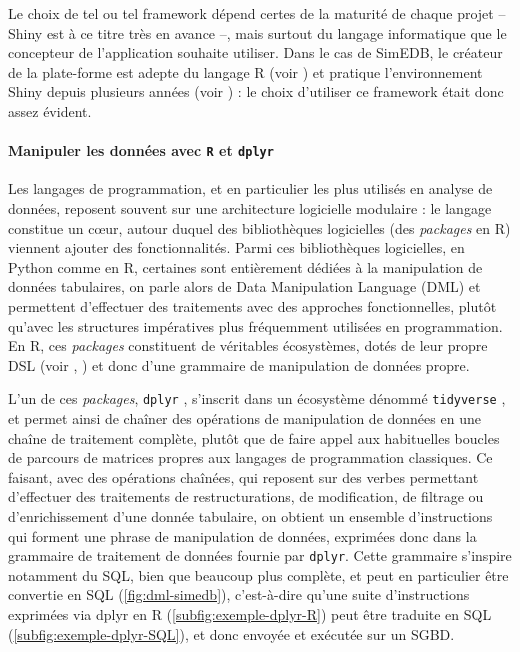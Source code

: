 Le choix de tel ou tel framework dépend certes de la maturité de chaque projet -- Shiny est à ce titre très en avance --, mais surtout du langage informatique que le concepteur de l'application souhaite utiliser.
Dans le cas de SimEDB, le créateur de la plate-forme est adepte du langage R (voir \cite{commenges_r_2014}) et pratique l'environnement Shiny depuis plusieurs années (voir \cite{cura_creer_2015}) : le choix d'utiliser ce framework était donc assez évident.	

\paragraph*{Manipuler les données avec \texttt{R} et \texttt{dplyr}}

Les langages de programmation, et en particulier les plus utilisés en analyse de données, reposent souvent sur une architecture logicielle modulaire : le langage constitue un cœur, autour duquel des bibliothèques logicielles (des \textit{packages} en R) viennent ajouter des fonctionnalités.
Parmi ces bibliothèques logicielles, en Python comme en R, certaines sont entièrement dédiées à la manipulation de données tabulaires, on parle alors de \og Data Manipulation Language\fg{} (DML) et permettent d'effectuer des traitements avec des approches fonctionnelles, plutôt qu'avec les structures impératives plus fréquemment utilisées en programmation.
En R, ces \textit{packages} constituent de véritables écosystèmes, dotés de leur propre DSL (voir , ) et donc d'une grammaire de manipulation de données propre.

L'un de ces \textit{packages}, \texttt{dplyr} \autocite{wickham_dplyr_2015}, s'inscrit dans un écosystème dénommé \texttt{tidyverse} \autocite{wickham_tidyverse_2017}, et permet ainsi de chaîner des opérations de manipulation de données en une chaîne de traitement complète, plutôt que de faire appel aux habituelles boucles de parcours de matrices propres aux langages de programmation classiques.
Ce faisant, avec des opérations chaînées, qui reposent sur des \og verbes\fg{} permettant d'effectuer des traitements de restructurations, de modification, de filtrage ou d'enrichissement d'une donnée tabulaire, on obtient un ensemble d'instructions qui forment une \og phrase\fg{} de manipulation de données, exprimées donc dans la \og grammaire de traitement de données\fg{} fournie par \texttt{dplyr}.
Cette \og grammaire\fg{} s'inspire notamment du SQL, bien que beaucoup plus complète, et peut en particulier être \og convertie\fg{} en SQL (\cref{fig:dml-simedb}), c'est-à-dire qu'une suite d'instructions exprimées via dplyr en R (\cref{subfig:exemple-dplyr-R}) peut être traduite en SQL (\cref{subfig:exemple-dplyr-SQL}), et donc envoyée et exécutée sur un SGBD.

